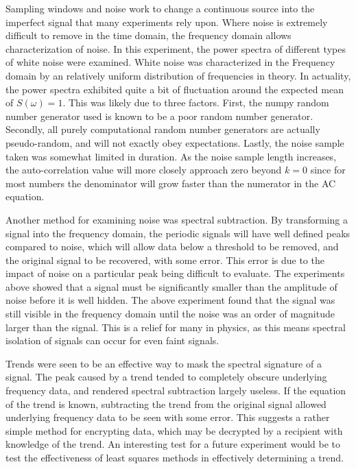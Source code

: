\documentclass[twocolumn]{article}
\begin{document}
Sampling windows and noise work to change a continuous source into the imperfect signal that many experiments rely upon. Where noise is extremely difficult to remove in the time domain, the frequency domain allows characterization of noise. In this experiment, the power spectra of different types of white noise were examined. White noise was characterized in the Frequency domain by an relatively uniform distribution of frequencies in theory. In actuality, the power spectra exhibited quite a bit of fluctuation around the expected mean of $S(\omega)=1$. This was likely due to three factors. First, the numpy random number generator used is known to be a poor random number generator. Secondly, all purely computational random number generators are actually pseudo-random, and will not exactly obey expectations. Lastly, the noise sample taken was somewhat limited in duration. As the noise sample length increases, the auto-correlation value will more closely approach zero beyond $k=0$ since for most numbers the denominator will grow faster than the numerator in the AC equation. 

Another method for examining noise was spectral subtraction. By transforming a signal into the frequency domain, the periodic signals will have well defined peaks compared to noise, which will allow data below a threshold to be removed, and the original signal to be recovered, with some error. This error is due to the impact of noise on a particular peak being difficult to evaluate. The experiments above showed that a signal must be significantly smaller than the amplitude of noise before it is well hidden. The above experiment found that the signal was still visible in the frequency domain until the noise was an order of magnitude larger than the signal. This is a relief for many in physics, as this means spectral isolation of signals can occur for even faint signals.

Trends were seen to be an effective way to mask the spectral signature of a signal. The peak caused by a trend tended to completely obscure underlying frequency data, and rendered spectral subtraction largely useless. If the equation of the trend is known, subtracting the trend from the original signal allowed underlying frequency data to be seen with some error. This suggests a rather simple method for encrypting data, which may be decrypted by a recipient with knowledge of the trend. An interesting test for a future experiment would be to test the effectiveness of least squares methods in effectively determining a trend. 
\end{document}
